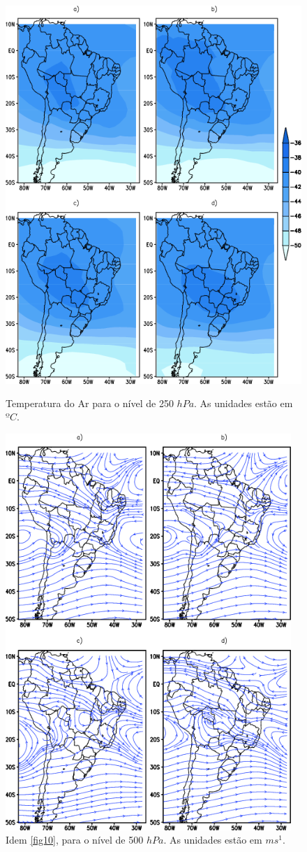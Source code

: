 \begin{figure}[!hbp]
\centering
\includegraphics[height=15cm]{./figs/media_temp_anl_250hPa.png}
\caption{Temperatura do Ar para o nível de 250 $hPa$. As unidades estão em $ºC$.}
\label{fig13}
\end{figure}

\begin{figure}[!hbp]
\centering
\includegraphics[height=15cm]{./figs/media_corrente_anl_500hPa.png}
\caption{Idem \autoref{fig10}, para o nível de 500 $hPa$. As unidades estão em $ms^{1}$.}
\label{fig14}
\end{figure}

